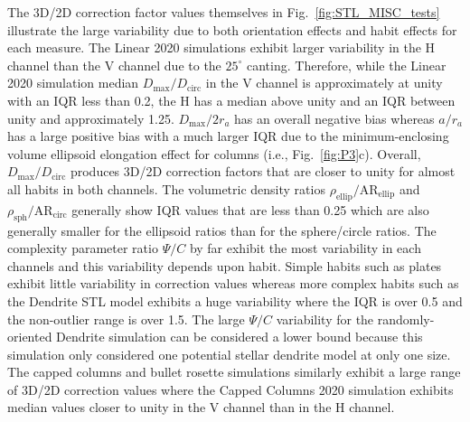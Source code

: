 \documentclass[amt, manuscript]{copernicus}
\begin{document}
The 3D/2D correction factor values themselves in Fig.~\ref{fig:STL_MISC_tests} illustrate the large variability due to both orientation effects and habit effects for each measure. The Linear 2020 simulations exhibit larger variability in the H channel than the V channel due to the $25^{\circ}$ canting. Therefore, while the Linear 2020 simulation median $D_{\max}/D_{\mathrm{circ}}$ in the V channel is approximately at unity with an IQR less than 0.2, the H has a median above unity and an IQR between unity and approximately 1.25. $D_{\max}/2r_{a}$ has an overall negative bias whereas $a/r_{a}$ has a large positive bias with a much larger IQR due to the minimum-enclosing volume ellipsoid elongation effect for columns (i.e., Fig.~\ref{fig:P3}c). Overall, $D_{\max}/D_{\mathrm{circ}}$ produces 3D/2D correction factors that are closer to unity for almost all habits in both channels. The volumetric density ratios $\rho_{\mathrm{ellip}}/\mathrm{AR}_{\mathrm{ellip}}$ and $\rho_{\mathrm{sph}}/\mathrm{AR}_{\mathrm{circ}}$ generally show IQR values that are less than 0.25 which are also generally smaller for the ellipsoid ratios than for the sphere/circle ratios. The complexity parameter ratio $\Psi/C$ by far exhibit the most variability in each channels and this variability depends upon habit. Simple habits such as plates exhibit little variability in correction values whereas more complex habits such as the Dendrite STL model exhibits a huge variability where the IQR is over 0.5 and the non-outlier range is over 1.5. The large $\Psi/C$ variability for the randomly-oriented Dendrite simulation can be considered a lower bound because this simulation only considered one potential stellar dendrite model at only one size. The capped columns and bullet rosette simulations similarly exhibit a large range of 3D/2D correction values where the Capped Columns 2020 simulation exhibits median values closer to unity in the V channel than in the H channel. 
\end{document}
